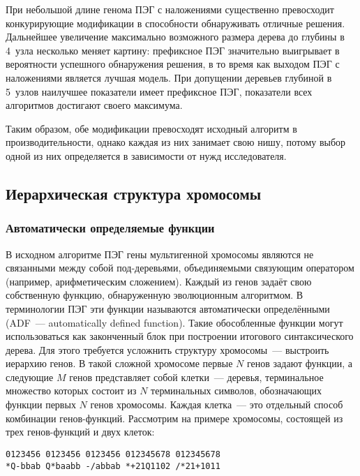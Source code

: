 При небольшой длине генома ПЭГ с наложениями существенно превосходит конкурирующие модификации в способности обнаруживать отличные решения. Дальнейшее увеличение максимально возможного размера дерева до глубины в 4~узла несколько меняет картину: префиксное ПЭГ значительно выигрывает в вероятности успешного обнаружения решения, в то время как выходом ПЭГ с наложениями является лучшая модель. При допущении деревьев глубиной в 5~узлов наилучшее показатели имеет префиксное ПЭГ, показатели всех алгоритмов достигают своего максимума.

Таким образом, обе модификации превосходят исходный алгоритм в производительности, однако каждая из них занимает свою нишу, потому выбор одной из них определяется в зависимости от нужд исследователя.




\subsection{Иерархическая структура хромосомы}

\subsubsection{Автоматически определяемые функции}

В исходном алгоритме ПЭГ гены мультигенной хромосомы являются не связанными между собой под-деревьями, объединяемыми связующим оператором (например, арифметическим сложением). Каждый из генов задаёт свою собственную функцию, обнаруженную эволюционным алгоритмом. В терминологии ПЭГ эти функции называются автоматически определёнными (ADF~--- automatically defined function). Такие обособленные функции могут использоваться как законченный блок при построении итогового синтаксического дерева. Для этого требуется усложнить структуру хромосомы~--- выстроить иерархию генов. В такой сложной хромосоме первые $N$ генов задают функции, а следующие $M$ генов представляет собой клетки~--- деревья, терминальное множество которых состоит из $N$ терминальных символов, обозначающих функции первых $N$ генов хромосомы. Каждая клетка~--- это отдельный способ комбинации генов-функций.
Рассмотрим на примере хромосомы, состоящей из трех генов-функций и двух клеток:

\begin{samepage}
\begin{verbatim}
0123456 0123456 0123456 012345678 012345678
*Q-bbab Q*baabb -/abbab *+21Q1102 /*21+1011
\end{verbatim}
\end{samepage}

